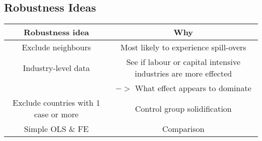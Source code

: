 \documentclass[10pt,a4paper]{article}
\begin{document}
\subsection*{Robustness Ideas}
\begin{tabular}{|c|c|}
\hline
Robustness idea & Why \\
\hline
Exclude neighbours & Most likely to experience spill-overs \\
Industry-level data & See if labour or capital intensive industries are more effected \\
& $->$ What effect appears to dominate \\
Exclude countries with 1 case or more & Control group solidification \\
Simple OLS \& FE & Comparison \\
\hline
\end{tabular} 
\end{document}
